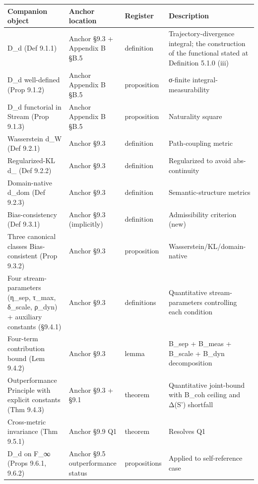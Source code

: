 \documentclass[11pt, openany]{book}
\begin{document}
\begingroup\setlength{\tabcolsep}{3pt}\renewcommand{\arraystretch}{1.15}\footnotesize
\begin{longtable}{p{1.45in} p{0.57in} p{0.55in} p{1.71in}}
\toprule
Companion object & Anchor location & Register & Description \\
\midrule
\endhead
\bottomrule
\endfoot
D\_\allowbreak{}d (Def 9.1.1) & Anchor §9.3 + Appendix B §B.5 & definition & Trajectory-divergence integral; the construction of the functional stated at Definition 5.1.0 (iii) \\
\midrule
D\_\allowbreak{}d well-defined (Prop 9.1.2) & Anchor Appendix B §B.5 & proposition & σ-finite integral-measurability \\
\midrule
D\_\allowbreak{}d functorial in Stream (Prop 9.1.3) & Anchor Appendix B §B.5 & proposition & Naturality square \\
\midrule
Wasserstein d\_\allowbreak{}W (Def 9.2.1) & Anchor §9.3 & definition & Path-coupling metric \\
\midrule
Regularized-KL d\_\allowbreak{}{KL,ε} (Def 9.2.2) & Anchor §9.3 & definition & Regularized to avoid abs-continuity \\
\midrule
Domain-native d\_\allowbreak{}dom (Def 9.2.3) & Anchor §9.3 & definition & Semantic-structure metrics \\
\midrule
Bias-consistency (Def 9.3.1) & Anchor §9.3 (implicitly) & definition & Admissibility criterion (new) \\
\midrule
Three canonical classes Bias-consistent (Prop 9.3.2) & Anchor §9.3 & proposition & Wasserstein/\allowbreak KL/\allowbreak domain-native \\
\midrule
Four stream-parameters (η\_\allowbreak{}sep, τ\_\allowbreak{}max, δ\_\allowbreak{}scale, ρ\_\allowbreak{}dyn) + auxiliary constants (§9.4.1) & Anchor §9.3 & definitions & Quantitative stream-parameters controlling each condition \\
\midrule
Four-term contribution bound (Lem 9.4.2) & Anchor §9.3 & lemma & B\_\allowbreak{}sep + B\_\allowbreak{}meas + B\_\allowbreak{}scale + B\_\allowbreak{}dyn decomposition \\
\midrule
Outperformance Principle with explicit constants (Thm 9.4.3) & Anchor §9.3 + §9.1 & theorem & Quantitative joint-bound with B\_\allowbreak{}coh ceiling and Δ(S') shortfall \\
\midrule
Cross-metric invariance (Thm 9.5.1) & Anchor §9.9 Q1 & theorem & Resolves Q1 \\
\midrule
D\_\allowbreak{}d on F\_\allowbreak{}∞ (Props 9.6.1, 9.6.2) & Anchor §9.5 outperformance status & propositions & Applied to self-reference case \\
\bottomrule
\end{longtable}
\endgroup
\end{document}
